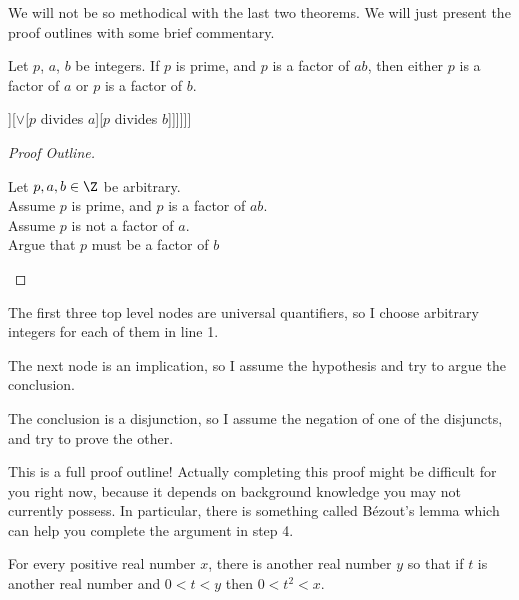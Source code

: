  

We will not be so methodical with the last two theorems.  We will just present the proof outlines with some brief commentary.

\begin{theorem}
		Let $p$, $a$, $b$ be integers.  If $p$ is prime, and $p$ is a factor of $ab$, then either $p$ is a factor of $a$ or $p$ is a factor of $b$.
	\end{theorem}

\begin{center}
		\begin{forest}
				[$\forall p$[$\forall a$[$\forall b$[$\implies$[$\wedge$[$p$ is prime][$p$ divides $ab$]][$\vee$[$p$ divides $a$][$p$ divides $b$]]]]]]
			\end{forest}
	\end{center}

\begin{proof}[Proof Outline]
	
			\leavevmode\newline
		\begin{fitch}
				\textrm{Let $p, a, b \in \Z$ be arbitrary.}\\
				\textrm{Assume $p$ is prime, and $p$ is a factor of $ab$.}\\
				\fa \textrm{Assume $p$ is not a factor of $a$.}\\
				\fa \fa \textrm{Argue that $p$ must be a factor of $b$}
			\end{fitch}
		
	\end{proof}

The first three top level nodes are universal quantifiers, so I choose arbitrary integers for each of them in line 1.

The next node is an implication, so I assume the hypothesis and try to argue the conclusion.

The conclusion is a disjunction, so I assume the negation of one of the disjuncts, and try to prove the other.

This is a full proof outline!  Actually completing this proof might be difficult for you right now, because it depends on background knowledge you may not currently possess.  In particular, there is something called Bézout's lemma which can help you complete the argument in step 4.

 \medskip
 
\begin{theorem}	
	For every positive real number $x$, there is another real number $y$ so that if $t$ is another real number and $0<t<y$ then $0<t^2<x$.
	\end{theorem}



